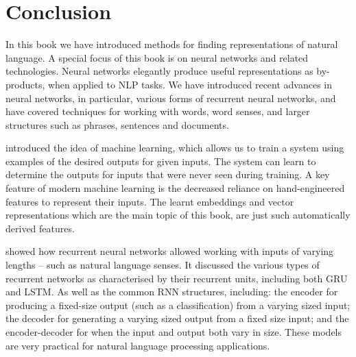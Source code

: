 \documentclass[12pt,parskip]{komatufte}
\begin{document}
\chapter{Conclusion}\label{sec:conclusion}

In this book we have introduced methods for finding representations of natural language.
A special  focus of this book is on neural networks and related technologies.
Neural networks elegantly produce useful representations as by-products, when applied to  NLP tasks.
We have introduced recent advances in neural networks, in particular, various forms of recurrent neural networks,
and have covered techniques for working with words, word senses, and larger structures such as phrases, sentences and documents.





 introduced the idea of machine learning,
which allows us to train a system using examples of the desired outputs for given inputs.
The system can learn to determine the outputs for inputs that were never seen during training.
A key feature of modern machine learning is the decreased reliance on hand-engineered features to represent their inputs.
The learnt embeddings and vector representations which are the main topic of this book, are just such automatically derived features.


 showed how recurrent neural networks allowed working with inputs of varying lengths -- such as natural language senses.
It discussed the various types of recurrent networks as characterised by their recurrent units, including both GRU and LSTM.
As well as the common RNN structures, including:
the encoder for producing a fixed-size  output (such as a classification) from a varying sized input;
the decoder for generating a varying sized output from a fixed size input;
and the encoder-decoder for when the input and output both vary in size.
These models are very practical for natural language processing applications.
\end{document}
